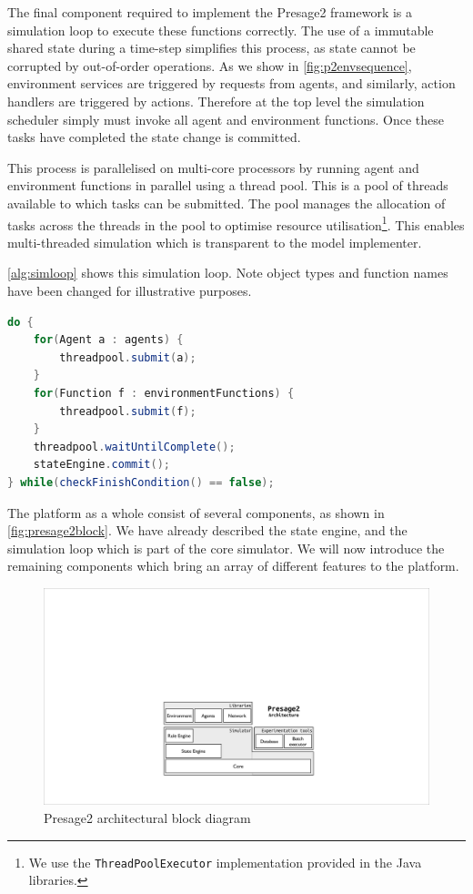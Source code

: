 The final component required to implement the Presage2 framework is a
simulation loop to execute these functions correctly. The use of a immutable
shared state during a time-step simplifies this process, as state cannot be
corrupted by out-of-order operations. As we show in
\autoref{fig:p2envsequence}, environment services are triggered by requests
from agents, and similarly, action handlers are triggered by actions.
Therefore at the top level the simulation scheduler simply must invoke all
agent and environment functions. Once these tasks have completed the state
change is committed.

This process is parallelised on multi-core processors by running agent and
environment functions in parallel using a thread pool. This is a pool of
threads available to which tasks can be submitted. The pool manages the
allocation of tasks across the threads in the pool to optimise resource
utilisation\footnote{We use the \texttt{ThreadPoolExecutor} implementation
provided in the Java libraries.}. This enables multi-threaded simulation which
is transparent to the model implementer.

\autoref{alg:simloop} shows this simulation loop. Note object types and function names have been changed for illustrative purposes.

\begin{lstlisting}[caption={Presage2 multi-threaded simulation loop},label=alg:simloop,language=Java,float=tbh]
do {
	for(Agent a : agents) {
		threadpool.submit(a);
	}
	for(Function f : environmentFunctions) {
		threadpool.submit(f);
	}
	threadpool.waitUntilComplete();
	stateEngine.commit();
} while(checkFinishCondition() == false);
\end{lstlisting}

The platform as a whole consist of several components, as shown in
\autoref{fig:presage2block}. We have already described the state engine, and
the simulation loop which is part of the core simulator. We will now introduce
the remaining components which bring an array of different features to the
platform.

\begin{figure}[tb]
\caption{Presage2 architectural block diagram}\label{fig:presage2block}
\includegraphics[width=\linewidth]{gfx/presage2/architecture_block}
\end{figure}

